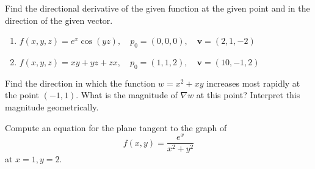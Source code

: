 \documentclass[openany]{book}
\begin{document}
\begin{prob}[26]
    Find the directional derivative of the given function at the given point and in the direction of the given vector.

    \begin{enumerate}
        \item[(a)] \( f(x, y, z) = e^x \cos(yz), \quad p_0 = (0, 0, 0), \quad \mathbf{v} = (2, 1, -2) \)
        \item[(b)] \( f(x, y, z) = xy + yz + zx, \quad p_0 = (1, 1, 2), \quad \mathbf{v} = (10, -1, 2) \)
    \end{enumerate}
\end{prob}


\begin{prob}[30]
    Find the direction in which the function \( w = x^2 + xy \) increases most rapidly at the point \((-1, 1)\). What is the magnitude of \( \nabla w \) at this point? Interpret this magnitude geometrically.
\end{prob}

\begin{prob}[40]
    Compute an equation for the plane tangent to the graph of
    \[
    f(x, y) = \frac{e^x}{x^2 + y^2}
    \]
    at \( x = 1, y = 2 \).
\end{prob}
\end{document}
